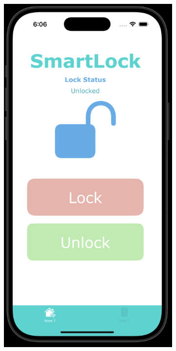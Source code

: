 \begin{figure}[h]
     \centering
     \begin{subfigure}{0.3\textwidth}
         \centering
         \includegraphics[width=\linewidth]{./img/unlockedPage.png}

\end{subfigure}
\end{figure}

